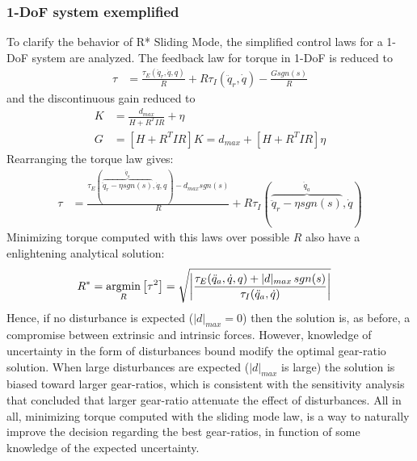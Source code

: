 \subsubsection{1-DoF system exemplified} 

To clarify the behavior of R* Sliding Mode, the simplified control laws for a 1-DoF system are analyzed. The feedback law for torque in 1-DoF is reduced to 
%
\begin{align}
	\tau &=  \frac{\tau_{E}(\ddot{q}_r,\dot{q},q)}{R} 
	+ R \tau_{I}(\ddot{q}_r,\dot{q})
  - \frac{G sgn( s ) }{R} 
\end{align}
%
and the discontinuous gain reduced to 
%
\begin{align}
K &= \frac{d_{max}}{H + R^T I R} + \eta \\
G &= \left[ H + R^T I R \right] K  =  d_{max} + \left[ H + R^T I R \right] \eta 
\end{align}
%
Rearranging the torque law gives:
%
\begin{align}
	\tau &=  \frac{\tau_{E}( \overbrace{ \ddot{q}_r - \eta sgn( s ) }^{\ddot{q}_a},\dot{q},q) - d_{max} sgn( s )  }{R} 
	+ R \tau_{I}(\overbrace{\ddot{q}_r - \eta sgn( s )}^{\ddot{q}_a} ,\dot{q})
\end{align}
%
Minimizing torque computed with this laws over possible $R$ also have a enlightening analytical solution:
%
\begin{align}
	R^{*} &= \operatornamewithlimits{argmin}\limits_{R} \left[ \tau^2 \right] = \sqrt{ \left | \frac{\tau_{E}(\ddot{q}_a,\dot{q},q) + | d |_{max} \, sgn( s ) }{\tau_{I}(\ddot{q}_a,\dot{q})} \right |   } 
\label{eq:rstar_sliding}
\end{align}
Hence, if no disturbance is expected ($| d |_{max}=0$) then the solution is, as before, a compromise between extrinsic and intrinsic forces. However, knowledge of uncertainty in the form of disturbances bound modify the optimal gear-ratio solution. When large disturbances are expected ($| d |_{max}$ is large) the solution is biased toward larger gear-ratios, which is consistent with the sensitivity analysis that concluded that larger gear-ratio attenuate the effect of disturbances. All in all, minimizing torque computed with the sliding mode law, is a way to naturally improve the decision regarding the best gear-ratios, in function of some knowledge of the expected uncertainty.
%

